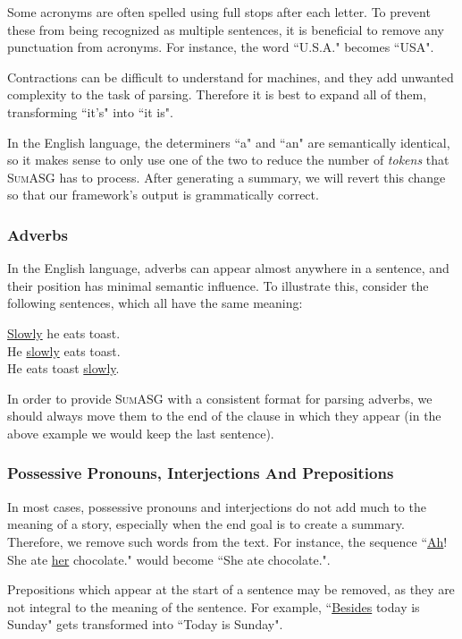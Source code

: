 Some acronyms are often spelled using full stops after each letter. To prevent these from being recognized as multiple sentences, it is beneficial to remove any punctuation from acronyms. For instance, the word ``U.S.A." becomes ``USA".

Contractions can be difficult to understand for machines, and they add unwanted complexity to the task of parsing. Therefore it is best to expand all of them, transforming ``it's" into ``it is".

In the English language, the determiners ``a" and ``an" are semantically identical, so it makes sense to only use one of the two to reduce the number of \textit{tokens} that \textsc{SumASG} has to process. After generating a summary, we will revert this change so that our framework's output is grammatically correct.

\subsubsection*{Adverbs}

In the English language, adverbs can appear almost anywhere in a sentence, and their position has minimal semantic influence. To illustrate this, consider the following sentences, which all have the same meaning:

\begin{displayquote}
\underline{Slowly} he eats toast. \\
He \underline{slowly} eats toast. \\
He eats toast \underline{slowly}.
\end{displayquote}

\noindent
In order to provide \textsc{SumASG} with a consistent format for parsing adverbs, we should always move them to the end of the clause in which they appear (in the above example we would keep the last sentence).

\subsubsection*{Possessive Pronouns, Interjections And Prepositions}

In most cases, possessive pronouns and interjections do not add much to the meaning of a story, especially when the end goal is to create a summary. Therefore, we remove such words from the text. For instance, the sequence ``\underline{Ah}! She ate \underline{her} chocolate." would become ``She ate chocolate.".

Prepositions which appear at the start of a sentence may be removed, as they are not integral to the meaning of the sentence. For example, ``\underline{Besides} today is Sunday" gets transformed into ``Today is Sunday".

